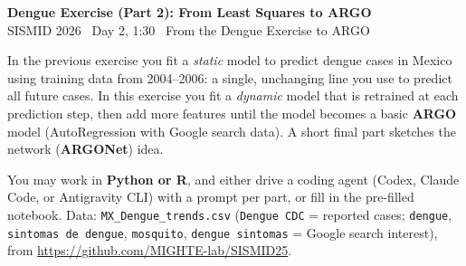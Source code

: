 \documentclass[11pt]{article}
\begin{document}
\begin{center}
  {\Large\bfseries Dengue Exercise (Part 2): From Least Squares to ARGO}\\[2pt]
  {\normalsize SISMID 2026 \textbullet\ Day 2, 1:30 \textbullet\ From the Dengue Exercise to ARGO}
\end{center}

\medskip

In the previous exercise you fit a \emph{static} model to predict dengue cases in Mexico
using training data from 2004--2006: a single, unchanging line you use to predict all future
cases. In this exercise you fit a \emph{dynamic} model that is retrained at each prediction
step, then add more features until the model becomes a basic \textbf{ARGO} model
(AutoRegression with Google search data). A short final part sketches the network
(\textbf{ARGONet}) idea.

You may work in \textbf{Python or R}, and either drive a coding agent (Codex, Claude Code,
or Antigravity CLI) with a prompt per part, or fill in the pre-filled notebook. Data:
\texttt{MX\_Dengue\_trends.csv} (\texttt{Dengue CDC} = reported cases; \texttt{dengue},
\texttt{sintomas de dengue}, \texttt{mosquito}, \texttt{dengue sintomas} = Google search
interest), from \url{https://github.com/MIGHTE-lab/SISMID25}.
\end{document}

